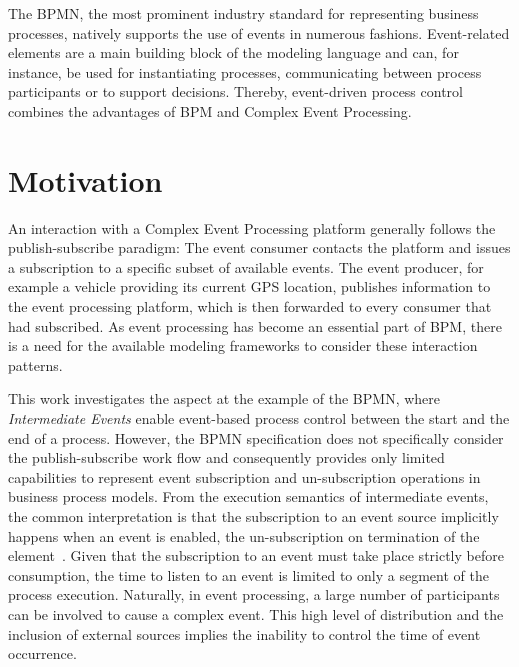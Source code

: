 The \ac{BPMN}, the most prominent industry standard for representing business processes, %
natively supports the use of events in numerous fashions. Event-related elements are a main building block of the modeling language and can, for instance, be used for instantiating processes, communicating between process participants or to support decisions.
Thereby, event-driven process control combines the advantages of \acl{BPM} and Complex Event Processing.


\section{Motivation}

An interaction with a Complex Event Processing platform generally follows the publish-subscribe paradigm: The event consumer contacts the platform and issues a subscription to a specific subset of available events.
The event producer, for example a vehicle providing its current GPS location, publishes information to the event processing platform, which is then forwarded to every consumer that had subscribed.
As event processing has become an essential part of \ac{BPM}, there is a need for the available modeling frameworks to consider these interaction patterns.

This work investigates the aspect at the example of the \ac{BPMN}, where \textit{Intermediate Events} enable event-based process control between the start and the end of a process. %
However, the BPMN specification does not specifically consider the publish-subscribe work flow and consequently provides only limited capabilities to represent event subscription and un-subscription operations in business process models.
From the execution semantics of intermediate events, the common interpretation is that the subscription to an event source implicitly happens when an event is enabled, the un-subscription on termination of the element~\cite{Pufahl2017, mandal:2017}.
Given that the subscription to an event must take place strictly before consumption, the time to listen to an event is limited to only a segment of the process execution.
Naturally, in event processing, a large number of participants can be involved to cause a complex event. This high level of distribution and the inclusion of external sources implies the inability to control the time of event occurrence.%

